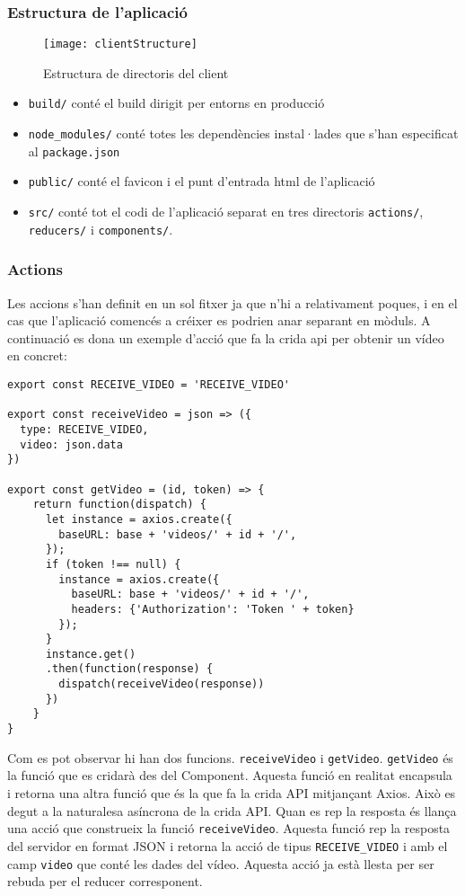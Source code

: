 \documentclass[12pt, titlepage]{article}
\begin{document}
\subsubsection{Estructura de l'aplicació}

\begin{figure}[H]
\centering
\texttt{[image: clientStructure]}
\caption{Estructura de directoris del client}
\end{figure}

\begin{itemize}
\item \verb|build/| conté el build dirigit per entorns en producció
\item \verb|node_modules/| conté totes les dependències instal·lades que s'han
especificat al \verb|package.json|
\item \verb|public/| conté el favicon i el punt d'entrada html de l'aplicació
\item \verb|src/| conté tot el codi de l'aplicació separat en tres directoris
\verb|actions/|, \verb|reducers/| i \verb|components/|.
\end{itemize}

\subsubsection{Actions}

Les accions s'han definit en un sol fitxer ja que n'hi a relativament poques, i en
el cas que l'aplicació comencés a créixer es podrien anar separant en mòduls.
A continuació es dona un exemple d'acció que fa la crida api per obtenir un
vídeo en concret:


\begin{lstlisting}[breaklines]
export const RECEIVE_VIDEO = 'RECEIVE_VIDEO'

export const receiveVideo = json => ({
  type: RECEIVE_VIDEO,
  video: json.data
})

export const getVideo = (id, token) => {
    return function(dispatch) {
      let instance = axios.create({
        baseURL: base + 'videos/' + id + '/',
      });
      if (token !== null) {
        instance = axios.create({
          baseURL: base + 'videos/' + id + '/',
          headers: {'Authorization': 'Token ' + token}
        });
      }
      instance.get()
      .then(function(response) {
        dispatch(receiveVideo(response))
      })
    }
}
\end{lstlisting}

Com es pot observar hi han dos funcions. \verb|receiveVideo| i \verb|getVideo|.
\verb|getVideo| és la funció que es cridarà des del Component. Aquesta funció en
realitat encapsula i retorna una altra funció que és la que fa la crida API
mitjançant Axios. Això es degut a la naturalesa asíncrona de la crida API. Quan
es rep la resposta és llança una acció que construeix la funció \verb|receiveVideo|.
Aquesta funció rep la resposta del servidor en format JSON i retorna la acció de
tipus \verb|RECEIVE_VIDEO| i amb el camp \verb|video| que conté les dades del vídeo.
Aquesta acció ja està llesta per ser rebuda per el reducer corresponent.
\end{document}
